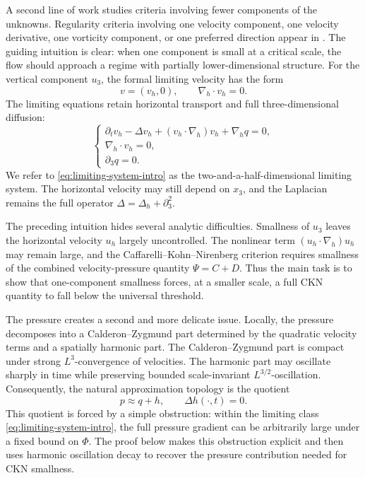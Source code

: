 \documentclass[pdflatex,sn-mathphys-num]{sn-jnl}
\numberwithin{equation}{section}
\theoremstyle{thmstyleone}
\theoremstyle{thmstylethree}
\newcommand{\nabh}{\nabla_h}
\begin{document}
A second line of work studies criteria involving fewer components of the
unknowns.  Regularity criteria involving one velocity component, one
velocity derivative, one vorticity component, or one preferred direction
appear in
\cite{PenelPokorny2004,KukavicaZiane2006,KukavicaZiane2007,ZhouPokorny2009,CaoTiti2011,CheminZhang2016,CheminZhangZhang2017,KukavicaRusinZiane2017,HanLeiLiZhao2019,KangNguyen2023}.  The guiding intuition is clear: when one component is
small at a critical scale, the flow should approach a regime with
partially lower-dimensional structure.  For the vertical component
\(u_3\), the formal limiting velocity has the form
\[
        v=(v_h,0),\qquad \nabh\cdot v_h=0.
\]
The limiting equations retain horizontal transport and full three-dimensional diffusion:
\begin{equation}
\begin{cases}
\partial_t v_h-\Delta v_h+(v_h\cdot\nabh)v_h+\nabh q=0,\\
\nabh\cdot v_h=0,\\
\partial_3q=0.
\end{cases}
\label{eq:limiting-system-intro}
\end{equation}
We refer to \eqref{eq:limiting-system-intro} as the two-and-a-half-dimensional limiting system.  The horizontal velocity may still depend on \(x_3\), and the Laplacian remains the full operator \(\Delta=\Delta_h+\partial_3^2\).

The preceding intuition hides several analytic difficulties.  Smallness of \(u_3\) leaves the horizontal velocity \(u_h\) largely uncontrolled.  The nonlinear term \((u_h\cdot\nabh)u_h\) may remain large, and the Caffarelli--Kohn--Nirenberg criterion requires smallness of the combined velocity-pressure quantity \(\Psi=C+D\).  Thus the main task is to show that one-component smallness forces, at a smaller scale, a full CKN quantity to fall below the universal threshold.

The pressure creates a second and more delicate issue.  Locally, the pressure decomposes into a Calderon--Zygmund part determined by the quadratic velocity terms and a spatially harmonic part.  The Calderon--Zygmund part is compact under strong \(L^3\)-convergence of velocities.  The harmonic part may oscillate sharply in time while preserving bounded scale-invariant \(L^{3/2}\)-oscillation.  Consequently, the natural approximation topology is the quotient
\[
        p\approx q+h,
        \qquad \Delta h(\cdot,t)=0.
\]
This quotient is forced by a simple obstruction: within the limiting class \eqref{eq:limiting-system-intro}, the full pressure gradient can be arbitrarily large under a fixed bound on \(\Phi\).  The proof below makes this obstruction explicit and then uses harmonic oscillation decay to recover the pressure contribution needed for CKN smallness.
\end{document}
